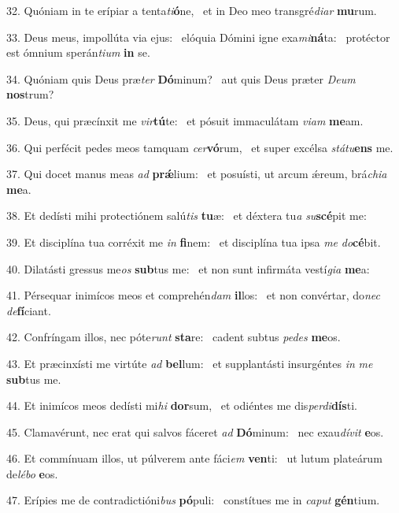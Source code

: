 32. Quóniam in te erípiar a tenta\textit{ti}\textbf{ó}ne, \ast\  et in Deo meo transgré\textit{di}\textit{ar} \textbf{mu}rum.\

33. Deus meus, impollúta via ejus: \dag\  elóquia Dómini igne exa\textit{mi}\textbf{ná}ta: \ast\  protéctor est ómnium sperán\textit{ti}\textit{um} \textbf{in} se.\

34. Quóniam quis Deus præ\textit{ter} \textbf{Dó}minum? \ast\  aut quis Deus præter \textit{De}\textit{um} \textbf{nos}trum?\

35. Deus, qui præcínxit me \textit{vir}\textbf{tú}te: \ast\  et pósuit immaculátam \textit{vi}\textit{am} \textbf{me}am.\

36. Qui perfécit pedes meos tamquam \textit{cer}\textbf{vó}rum, \ast\  et super excélsa \textit{stá}\textit{tu}\textbf{ens} me.\

37. Qui docet manus meas \textit{ad} \textbf{prǽ}lium: \ast\  et posuísti, ut arcum ǽreum, brá\textit{chi}\textit{a} \textbf{me}a.\

38. Et dedísti mihi protectiónem salú\textit{tis} \textbf{tu}æ: \ast\  et déxtera tu\textit{a} \textit{su}\textbf{scé}pit me:\

39. Et disciplína tua corréxit me \textit{in} \textbf{fi}nem: \ast\  et disciplína tua ipsa \textit{me} \textit{do}\textbf{cé}bit.\

40. Dilatásti gressus me\textit{os} \textbf{sub}tus me: \ast\  et non sunt infirmáta vestí\textit{gi}\textit{a} \textbf{me}a:\

41. Pérsequar inimícos meos et comprehén\textit{dam} \textbf{il}los: \ast\  et non convértar, do\textit{nec} \textit{de}\textbf{fí}ciant.\

42. Confríngam illos, nec póte\textit{runt} \textbf{sta}re: \ast\  cadent subtus \textit{pe}\textit{des} \textbf{me}os.\

43. Et præcinxísti me virtúte \textit{ad} \textbf{bel}lum: \ast\  et supplantásti insurgéntes \textit{in} \textit{me} \textbf{sub}tus me.\

44. Et inimícos meos dedísti mi\textit{hi} \textbf{dor}sum, \ast\  et odiéntes me dis\textit{per}\textit{di}\textbf{dís}ti.\

45. Clamavérunt, nec erat qui salvos fáceret \textit{ad} \textbf{Dó}minum: \ast\  nec exau\textit{dí}\textit{vit} \textbf{e}os.\

46. Et commínuam illos, ut púlverem ante fáci\textit{em} \textbf{ven}ti: \ast\  ut lutum plateárum de\textit{lé}\textit{bo} \textbf{e}os.\

47. Erípies me de contradictióni\textit{bus} \textbf{pó}puli: \ast\  constítues me in \textit{ca}\textit{put} \textbf{gén}tium.\

